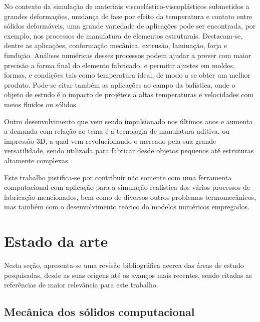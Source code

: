 \documentclass[Tese.tex]{subfiles}
\begin{document}
No contexto da simulação de materiais viscoelástico-viscoplásticos
submetidos a grandes deformações, mudança de fase por efeito da
temperatura e contato entre sólidos deformáveis, uma grande
variedade de aplicações pode ser encontrada, por exemplo, nos
processos de manufatura de elementos estruturais. Destacam-se, dentre
as aplicações, conformação mecânica, extrusão, laminação, forja e
fundição.  Análises numéricas desses processos podem ajudar a prever
com maior precisão a forma final do elemento fabricado, e permitir
ajustes em moldes, formas, e condições tais como temperatura ideal, de
modo a se obter um melhor produto.  Pode-se citar também as 
aplicações ao campo da balística, onde o objeto de estudo é o impacto de projéteis a
altas temperaturas e velocidades com meios fluidos ou sólidos.

Outro desenvolvimento que vem sendo impulsionado nos últimos anos e aumenta a demanda com relação ao tema é a tecnologia de manufatura aditiva, ou impressão 3D, a qual vem revolucionando o mercado pela sua grande versatilidade, sendo utilizada para fabricar desde objetos pequenos até estruturas altamente complexas. 

Este trabalho justifica-se por contribuir não somente com uma ferramenta computacional com aplicação para a simulação realística dos vários processos de fabricação mencionados, bem como de diversos outros problemas termomecânicos, mas também com o desenvolvimento teórico do modelos numéricos empregados.

\section{Estado da arte}\label{sec:estado-da-arte}

Nesta seção, apresenta-se uma revisão bibliográfica acerca das áreas de estudo pesquisadas, desde as suas origens até os avanços mais recentes, sendo citadas as referências de maior relevância para este trabalho.

\subsection{Mecânica dos sólidos computacional}\label{subsec:mefp}
\end{document}
